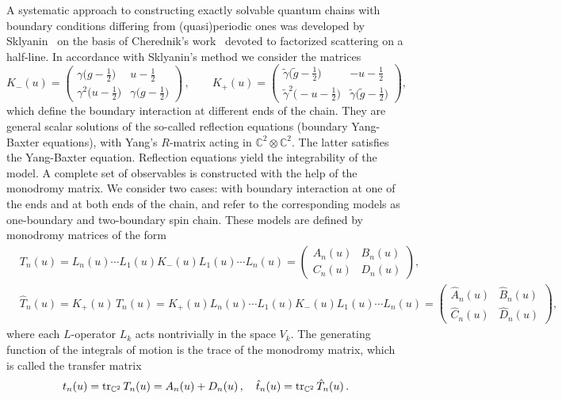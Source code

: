 \documentclass[a4paper,11pt]{article}
\newcommand{\tr}{\mathop{\rm tr}\nolimits}
\numberwithin{equation}{section}
\begin{document}
A systematic approach to constructing exactly solvable quantum chains with boundary conditions differing from (quasi)periodic ones was developed by Sklyanin~\cite{Skl:Boundary} on the basis of Cherednik's work~\cite{Ch} devoted to factorized scattering on a half-line.
In accordance with Sklyanin's method we consider the matrices
\begin{equation} \nonumber 
	K_-(u) = \begin{pmatrix}
		\gamma\bigl(g - \frac{1}{2} \bigr) & u - \frac{1}{2} \\[6pt]
		\gamma^2 \bigl(u - \frac{1}{2} \bigr) & \gamma\bigl(g - \frac{1}{2} \bigr)
	\end{pmatrix} \,,
	\qquad
	K_+(u) = \begin{pmatrix}
		\tilde{\gamma}\bigl(\tilde{g} - \frac{1}{2} \bigr) & -u - \frac{1}{2} \\[6pt]
		\tilde{\gamma}^2\bigl(-u - \frac{1}{2} \bigr) & \tilde{\gamma}\bigl(\tilde{g} - \frac{1}{2} \bigr)
	\end{pmatrix} ,
\end{equation}
which define the boundary interaction at different ends of the chain.
They are general scalar solutions of the so-called reflection equations (boundary Yang-Baxter equations), with Yang's $R$-matrix acting in $\mathbb{C}^2\otimes\mathbb{C}^2$. The latter satisfies the Yang-Baxter equation.
Reflection equations yield the integrability of the model.
A complete set of observables is constructed with the help of the monodromy matrix.
We consider two cases: with boundary interaction at one of the ends and at both ends of the chain, and refer to the corresponding models as one-boundary and two-boundary spin chain.
These models are defined by monodromy matrices of the form~\cite{Skl:Boundary, KS, PP}
\begin{align}
	& \label{Tint}
	T_n(u) = L_n(u) \cdots L_1(u) K_-(u) L_1(u) \cdots L_n(u) = \begin{pmatrix}
		A_n(u) & B_n(u) \\
		C_n(u) & D_n(u)
	\end{pmatrix} ,
	\\
	& \nonumber
	\hat{T}_n(u) =K_+(u)\,T_n(u) =K_+(u) L_n(u) \cdots L_1(u) K_-(u) L_1(u) \cdots L_n(u) = \begin{pmatrix}
		\hat{A}_n(u) & \hat{B}_n(u) \\
		\hat{C}_n(u) & \hat{D}_n(u)
	\end{pmatrix} ,
\end{align}
where each $L$-operator $L_k$ acts nontrivially in the space $V_k$.
The generating function of the integrals of motion is the trace of the monodromy matrix, which is called the transfer matrix
\begin{equation} \nonumber
	t_n(u) = \tr_{\mathbb{C}^2}T_n(u)=A_n(u)+D_n(u) \,, \quad
	\hat{t}_n(u) = \tr_{\mathbb{C}^2}\hat{T}_n(u) \,.
\end{equation}
\end{document}
